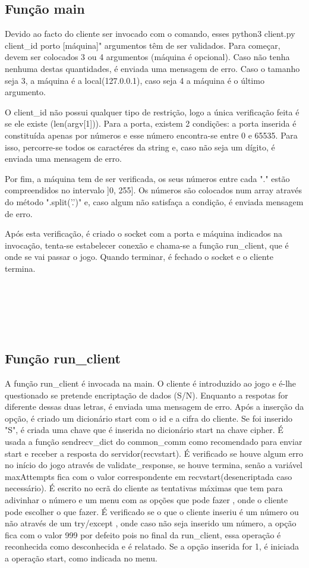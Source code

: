 \documentclass{report}
\begin{document}
\subsection{Função main}
\label{ssec:main}
Devido ao facto do cliente ser invocado com o comando, esses python3 client.py client\_id porto [máquina]"
argumentos têm de ser validados. Para começar, devem ser colocados 3 ou 4 argumentos (máquina é opcional).
Caso não tenha nenhuma destas quantidades, é enviada uma mensagem de erro. Caso o tamanho seja 3, a máquina é
a local(127.0.0.1), caso seja 4 a máquina é o último argumento. 

O client\_id não possui qualquer tipo de restrição, 
logo a única verificação feita é se ele existe (len(argv[1])). Para a porta, existem 2 condições: a porta inserida é 
constituída apenas por números e esse número encontra-se entre 0 e 65535. Para isso, percorre-se todos os caractéres 
da string e, caso não seja um dígito, é enviada uma mensagem de erro.

Por fim, a máquina tem de ser verificada,
os seus números entre cada "." estão compreendidos no intervalo ]0, 255]. Os números são colocados num array através
do método ".split('.')" e, caso algum não satisfaça a condição, é enviada mensagem de erro.

Após esta verificação, é criado o socket com a porta e máquina indicados na invocação, tenta-se estabelecer conexão e chama-se a 
função run\_client, que é onde se vai passar o jogo. Quando terminar, é fechado o socket e o cliente termina.

\begin{lstlisting}






\end{lstlisting}

\subsection{Função run\_client}
\label{ssec:runclient}
A função run\_client é invocada na main. O cliente é introduzido ao jogo e é-lhe questionado se pretende encriptação
de dados (S/N). Enquanto a respotas for diferente dessas duas letras, é enviada uma mensagem de erro. Após a inserção da
opção, é criado um dicionário start com o id e a cifra do cliente. Se foi inserido "S", é criada uma chave que é inserida
no dicionário start na chave cipher. É usada a função sendrecv\_dict do common\_comm como recomendado para enviar start
e receber a resposta do servidor(recvstart). É verificado se houve algum erro no início do jogo através de validate\_response,
se houve termina, senão a variável maxAttempts fica com o valor correspondente em recvstart(desencriptada caso necessário). É escrito no ecrã do cliente as tentativas máximas que tem para adivinhar o número e um menu com as opções que pode fazer
, onde o cliente pode escolher o que fazer. É verificado se o que o cliente inseriu é um número ou não através de um try/except
, onde caso não seja inserido um número, a opção fica com o valor 999 por defeito pois no final da run\_client, essa operação é
 reconhecida como desconhecida e é relatado. Se a opção inserida for 1, é iniciada a operação start, como indicada no menu. 
\end{document}
